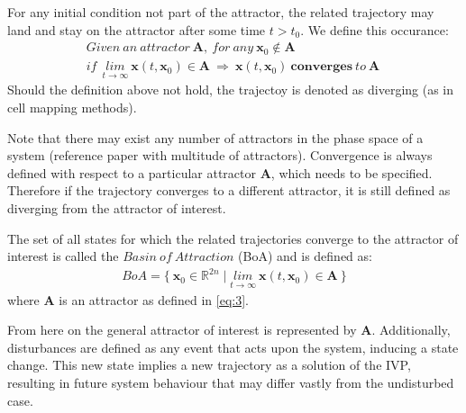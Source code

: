     For any initial condition not part of the attractor, the related trajectory may land and stay on the attractor after some time $t > t_0$. We define this occurance: 
    \begin{gather} \label{eq:6} Given\ an\ attractor\ \mathbf{A},\ for\ any\ \mathbf{x}_0 \notin \mathbf{A}\\ if\ \ \underset{t \rightarrow \infty}{lim} \ \mathbf{x}(t,\mathbf{x}_0) \in \mathbf{A}\ \Rightarrow\
    \mathbf{x}(t,\mathbf{x}_0)\ \mathbf{converges}\ to\ \mathbf{A}\ \end{gather}
    Should the definition above not hold, the trajectoy is denoted as diverging (as in cell mapping methods). 

    Note that there may exist any number of attractors in the phase space of a system (reference paper with multitude of attractors). Convergence is always defined with respect to a particular attractor $\mathbf{A}$, which needs to be specified. Therefore if the trajectory converges to a different attractor, it is still defined as diverging from the attractor of interest.  

    The set of all states for which the related trajectories converge to the attractor of interest is called the $Basin\ of\ Attraction$ (BoA) and is defined as: 
    \begin{gather} \label{eq:7} BoA = \{\ \mathbf{x}_0 \in \mathbb{R}^{2n} \mid  \underset{t \rightarrow \infty}{lim} \ \mathbf{x}(t,\mathbf{x}_0) \in \mathbf{A}\ \}\end{gather}
    where $\mathbf{A}$ is an attractor as defined in \ref{eq:3}.

    From here on the general attractor of interest is represented by $\mathbf{A}$.
    Additionally, disturbances are defined as any event that acts upon the system, inducing a state change. This new state implies a new trajectory as a solution of the IVP, resulting in future system behaviour that may differ vastly from the undisturbed case.





